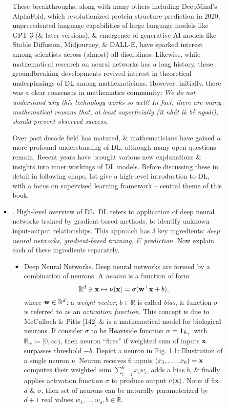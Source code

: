 \documentclass{article}
\begin{document}
\begin{enumerate}
\begin{itemize}
\begin{itemize}
			These breakthroughs, along with many others including DeepMind's AlphaFold, which revolutionized protein structure prediction in 2020, unprecedented language capabilities of large language models like GPT-3 (\& later versions), \& emergence of generative AI models like Stable Diffusion, Midjourney, \& DALL-E, have sparked interest among scientists across (almost) all disciplines. Likewise, while mathematical research on neural networks has a long history, these groundbreaking developments revived interest in theoretical underpinnings of DL among mathematicians. However, initially, there was a clear consensus in mathematics community: {\it We do not understand why this technology works so well! In fact, there are many mathematical reasons that, at least superficially (ít nhất là bề ngoài), should prevent observed success}.
			
			Over past decade field has matured, \& mathematicians have gained a more profound understanding of DL, although many open questions remain. Recent years have brought various new explanations \& insights into inner workings of DL models. Before discussing these in detail in following chaps, 1st give a high-level introduction to DL, with a focus on supervised learning framework -- central theme of this book.
			\item {. High-level overview of DL.} DL refers to application of deep neural networks trained by gradient-based methods, to identify unknown input-output relationships. This approach has 3 key ingredients: {\it deep neural networks, gradient-based training, \& prediction}. Now explain each of these ingredients separately.
			\begin{itemize}
				\item {\sf Deep Neural Networks.} Deep neural networks are formed by a combination of neurons. A {\it neuron} is a function of form
				\begin{equation}
					\label{neuron}
					\mathbb{R}^d\ni{\bf x}\mapsto\nu({\bf x}) = \sigma({\bf w}^\top{\bf x} + b),
				\end{equation}
				where ${\bf w}\in\mathbb{R}^d$: a {\it weight vector}, $b\in\mathbb{R}$ is called {\it bias}, \& function $\sigma$ is referred to as an {\it activation function}. This concept is due to McCulloch \& Pitts [142] \& is a mathematical model for biological neurons. If consider $\sigma$ to be Heaviside function $\sigma = {\bf1}_{\mathbb{R}_+}$ with $\mathbb{R}_+\coloneqq[0,\infty)$, then neuron ``fires'' if weighted sum of inputs ${\bf x}$ surpasses threshold $-b$. Depict a neuron in {\sf Fig. 1.1: Illustration of a single neuron $\nu$. Neuron receives 6 inputs $(x_1,\ldots,x_6) = {\bf x}$ computes their weighted sum $\sum_{i=1}^6 x_iw_i$, adds a bias $b$, \& finally applies activation function $\sigma$ to produce output $\nu({\bf x})$}. Note: if fix $d$ \& $\sigma$, then set of neurons can be naturally parameterized by $d + 1$ real values $w_1,\ldots,w_d,b\in\mathbb{R}$.
				

\end{itemize}
\end{itemize}
\end{itemize}
\end{enumerate}
\end{document}
